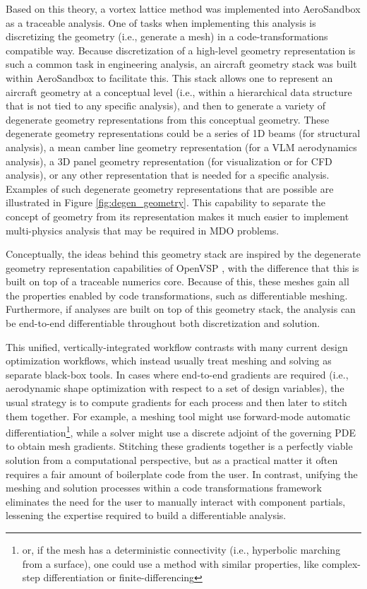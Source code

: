 Based on this theory, a vortex lattice method was implemented into AeroSandbox as a traceable analysis. One of tasks when implementing this analysis is discretizing the geometry (i.e., generate a mesh) in a code-transformations compatible way. Because discretization of a high-level geometry representation is such a common task in engineering analysis, an aircraft geometry stack was built within AeroSandbox to facilitate this. This stack allows one to represent an aircraft geometry at a conceptual level (i.e., within a hierarchical data structure that is not tied to any specific analysis), and then to generate a variety of degenerate geometry representations from this conceptual geometry. These degenerate geometry representations could be a series of 1D beams (for structural analysis), a mean camber line geometry representation (for a VLM aerodynamics analysis), a 3D panel geometry representation (for visualization or for CFD analysis), or any other representation that is needed for a specific analysis. Examples of such degenerate geometry representations that are possible are illustrated in Figure \ref{fig:degen_geometry}. This capability to separate the concept of geometry from its representation makes it much easier to implement multi-physics analysis that may be required in MDO problems.

Conceptually, the ideas behind this geometry stack are inspired by the degenerate geometry representation capabilities of OpenVSP \cite{mcdonald_open_2022}, with the difference that this is built on top of a traceable numerics core. Because of this, these meshes gain all the properties enabled by code transformations, such as differentiable meshing. Furthermore, if analyses are built on top of this geometry stack, the analysis can be end-to-end differentiable throughout both discretization and solution.

This unified, vertically-integrated workflow contrasts with many current design optimization workflows, which instead usually treat meshing and solving as separate black-box tools. In cases where end-to-end gradients are required (i.e., aerodynamic shape optimization with respect to a set of design variables), the usual strategy is to compute gradients for each process and then later to stitch them together. For example, a meshing tool might use forward-mode automatic differentiation\footnote{or, if the mesh has a deterministic connectivity (i.e., hyperbolic marching from a surface), one could use a method with similar properties, like complex-step differentiation or finite-differencing}, while a solver might use a discrete adjoint of the governing PDE to obtain mesh gradients. Stitching these gradients together is a perfectly viable solution from a computational perspective, but as a practical matter it often requires a fair amount of boilerplate code from the user. In contrast, unifying the meshing and solution processes within a code transformations framework eliminates the need for the user to manually interact with component partials, lessening the expertise required to build a differentiable analysis.

